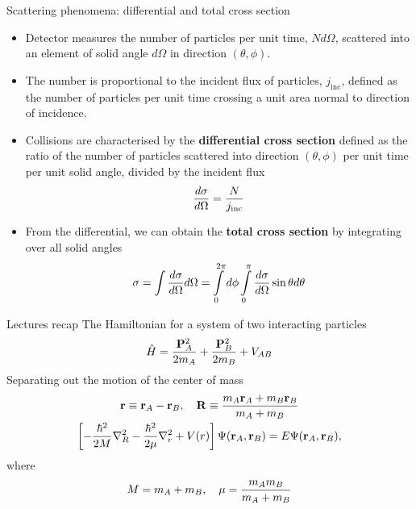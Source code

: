 \documentclass[10pt,pdf,hyperref={unicode}]{beamer}
\begin{document}
\begin{frame}{Scattering phenomena: differential and total cross section}
\begin{itemize}
	\item Detector measures the number of particles per unit time, $N d\Omega$, scattered into an element of solid angle $d\Omega$ in direction $(\theta, \phi)$.
	\item The number is proportional to the incident flux of particles, $j_\text{inc}$, defined as the number of particles per unit time crossing a unit area normal to direction of incidence.
	\item Collisions are characterised by the \textbf{differential cross section} defined as the ratio of the number of particles scattered into direction $(\theta, \phi)$ per unit time per unit solid angle, divided by the incident flux
	\begin{gather}
		\frac{d\sigma}{d\Omega} = \frac{N}{j_\text{inc}} \notag
	\end{gather}
	\item From the differential, we can obtain the \textbf{total cross section} by integrating over all solid angles
	\begin{gather}
		\sigma = \int \frac{d\sigma}{d\Omega} d\Omega = \int\limits_0^{2\pi} d \phi \int\limits_0^\pi \frac{d\sigma}{d\Omega} \sin \theta d\theta \notag
	\end{gather}
\end{itemize}
\end{frame}


\begin{frame}{Lectures recap}
	The Hamiltonian for a system of two interacting particles
	\begin{gather}
		\hat{H} = \frac{\mathbf{P}_A^2}{2 m_A} + \frac{\mathbf{P}_B^2}{2 m_B} + V_{AB} \notag
	\end{gather}
	Separating out the motion of the center of mass
	\begin{gather}
		\mathbf{r} \equiv \mathbf{r}_A - \mathbf{r}_B, \quad \mathbf{R} \equiv \frac{m_A \mathbf{r}_A + m_B \mathbf{r}_B}{m_A + m_B} \notag \\
		\left[ -\frac{\hbar^2}{2M} \nabla_R^2 - \frac{\hbar^2}{2\mu} \nabla_r^2 + V(r) \right] \Psi(\mathbf{r}_A, \mathbf{r}_B) = E \Psi(\mathbf{r}_A, \mathbf{r}_B), \notag
	\end{gather}
	where 
	\begin{gather}
		M = m_A + m_B, \quad \mu = \frac{m_A m_B}{m_A  + m_B} \notag
	\end{gather}
\end{frame}
\end{document}
